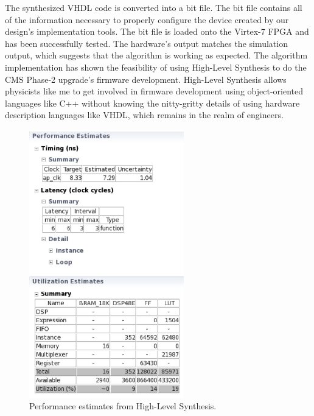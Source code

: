 The synthesized VHDL code is converted into a bit file. The bit file contains all of the information necessary to properly configure the device created by our design's implementation tools. The bit file is loaded onto the Virtex-7 FPGA and has been successfully tested. The hardware's output matches the simulation output, which suggests that the algorithm is working as expected. The algorithm implementation has shown the feasibility of using High-Level Synthesis to do the CMS Phase-2 upgrade's firmware development. High-Level Synthesis allows physicists like me to get involved in firmware development using object-oriented languages like C++ without knowing the nitty-gritty details of using hardware description languages like VHDL, which remains in the realm of engineers.

\begin{figure}[htbp]
  \centering
  \includegraphics[width=0.6\textwidth]{plots/chapter3/HLS.png}
  \caption{Performance estimates from High-Level Synthesis.}
  \label{fig:HLS}
\end{figure}

